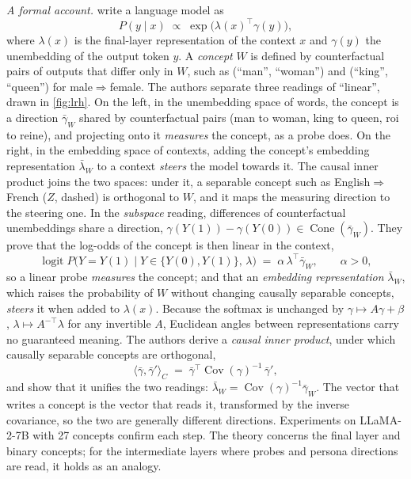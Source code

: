 \emph{A formal account.} \textcite{park2024linear} write a language model as
\begin{equation}
  P(y \mid x) \;\propto\; \exp\!\big(\lambda(x)^{\top}\gamma(y)\big),
  \label{eq:lrh-model}
\end{equation}
where $\lambda(x)$ is the final-layer representation of the context $x$ and $\gamma(y)$ the
unembedding of the output token $y$. A \emph{concept} $W$ is defined by counterfactual pairs of outputs
that differ only in $W$, such as (``man'', ``woman'') and (``king'', ``queen'') for
male$\Rightarrow$female. The authors separate three readings of ``linear'', drawn in
\cref{fig:lrh}. On the left, in the unembedding space of words, the concept is a direction
$\bar\gamma_W$ shared by counterfactual pairs (man to woman, king to queen, roi to reine), and
projecting onto it \emph{measures} the concept, as a probe does. On the right, in the embedding space
of contexts, adding the concept's embedding representation $\bar\lambda_W$ to a context
\emph{steers} the model towards it. The causal inner product joins the two spaces: under it, a
separable concept such as English$\Rightarrow$French ($Z$, dashed) is orthogonal to $W$, and it
maps the measuring direction to the steering one. In the
\emph{subspace} reading, differences of counterfactual unembeddings share a direction,
$\gamma(Y(1)) - \gamma(Y(0)) \in \operatorname{Cone}(\bar\gamma_W)$. They prove that the log-odds of
the concept is then linear in the context,
\begin{equation}
  \operatorname{logit} P\big(Y = Y(1) \mid Y \in \{Y(0), Y(1)\},\, \lambda\big) \;=\;
  \alpha\, \lambda^{\top}\bar\gamma_W , \qquad \alpha > 0,
  \label{eq:lrh-measure}
\end{equation}
so a linear probe \emph{measures} the concept; and that an \emph{embedding representation}
$\bar\lambda_W$, which raises the probability of $W$ without changing causally separable concepts,
\emph{steers} it when added to $\lambda(x)$. Because the softmax is unchanged by $\gamma \mapsto
A\gamma + \beta$, $\lambda \mapsto A^{-\top}\lambda$ for any invertible $A$, Euclidean angles between
representations carry no guaranteed meaning. The authors derive a \emph{causal inner product}, under
which causally separable concepts are orthogonal,
\begin{equation}
  \langle \bar\gamma, \bar\gamma' \rangle_{C} \;=\; \bar\gamma^{\top}\operatorname{Cov}(\gamma)^{-1}\,\bar\gamma' ,
  \label{eq:causal-ip}
\end{equation}
and show that it unifies the two readings: $\bar\lambda_W = \operatorname{Cov}(\gamma)^{-1}\bar\gamma_W$.
The vector that writes a concept is the vector that reads it, transformed by the inverse covariance,
so the two are generally different directions. Experiments on LLaMA-2-7B with 27 concepts confirm each
step. The theory concerns the final layer and binary concepts; for the intermediate layers where
probes and persona directions are read, it holds as an analogy.

